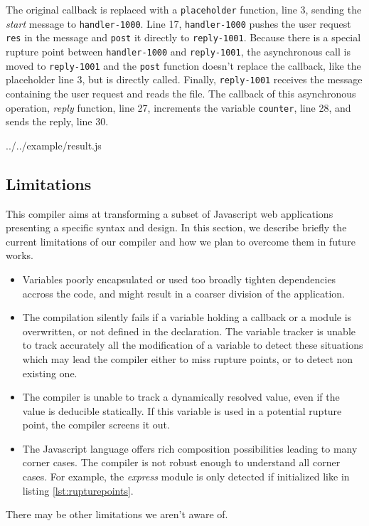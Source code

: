 The original callback is replaced with a \texttt{placeholder} function, line 3, sending the \textit{start} message to \texttt{handler-1000}.
Line 17, \texttt{handler-1000} pushes the user request \texttt{res} in the message and \texttt{post} it directly to \texttt{reply-1001}.
Because there is a special rupture point between \texttt{handler-1000} and \texttt{reply-1001}, the asynchronous call is moved to \texttt{reply-1001} and the \texttt{post} function doesn't replace the callback, like the placeholder line 3, but is directly called.
Finally, \texttt{reply-1001} receives the message containing the user request and reads the file.
The callback of this asynchronous operation, \textit{reply} function, line 27, increments the variable \texttt{counter}, line 28, and sends the reply, line 30.

{../../example/result.js}

\subsection{Limitations}

This compiler aims at transforming a subset of Javascript web applications presenting a specific syntax and design.
In this section, we describe briefly the current limitations of our compiler and how we plan to overcome them in future works.

\begin{itemize}
  \item Variables poorly encapsulated or used too broadly tighten dependencies accross the code, and might result in a coarser division of the application.
  \item The compilation silently fails if a variable holding a callback or a module is overwritten, or not defined in the declaration.
        The variable tracker is unable to track accurately all the modification of a variable to detect these situations which may lead the compiler either to miss rupture points, or to detect non existing one.
  \item The compiler is unable to track a dynamically resolved value, even if the value is deducible statically.
        If this variable is used in a potential rupture point, the compiler screens it out.
  \item The Javascript language offers rich composition possibilities leading to many corner cases.
        The compiler is not robust enough to understand all corner cases.
        For example, the \textit{express} module is only detected if initialized like in listing \ref{lst:rupturepoints}.
\end{itemize}
There may be other limitations we aren't aware of.

